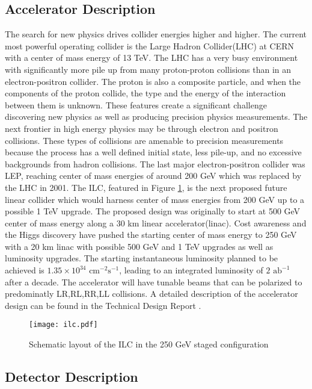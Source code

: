 \subsection{Accelerator Description}
\label{ilc}


The search for new physics drives collider energies higher and higher. The current most powerful operating collider is the Large Hadron Collider(LHC) at CERN with a center of mass energy of 13 TeV. The LHC has a very busy environment with significantly more pile up from many proton-proton collisions than in an electron-positron collider. The proton is also a composite particle, and when the components of the proton collide, the type and the energy of the interaction between them is unknown. These features create a significant challenge discovering new physics as well as producing precision physics measurements. The next frontier in high energy physics may be through electron and positron collisions. These types of collisions are amenable to precision measurements because the process has a well defined initial state, less pile-up, and no excessive backgrounds from hadron collisions. The last major electron-positron collider was LEP, reaching center of mass energies of around 200 GeV which was replaced by the LHC in 2001.  The ILC, featured in Figure \ref{fig:ilc}, is the next proposed future linear collider which would harness center of mass energies from 200 GeV up to a possible 1 TeV upgrade.  The proposed design was originally to start at 500 GeV center of mass energy along a 30 km linear accelerator(linac). Cost awareness and the Higgs discovery have pushed the starting center of mass energy to 250 GeV  with a 20 km linac with possible 500 GeV and 1 TeV upgrades as well as luminosity upgrades.  The starting instantaneous luminosity planned to be achieved is $1.35 \times 10^{34} \, \, \text{cm}^{-2}\text{s}^{-1}$, leading to an integrated luminosity of $2 \, \, \text{ab}^{-1}$ after a decade. The accelerator will have tunable beams that can be polarized to predominatly LR,RL,RR,LL collisions.\cite{currdetector} A detailed description of the accelerator design can be found in the Technical Design Report \cite{tdraccel}.

\begin{figure}
\centering
\texttt{[image: ilc.pdf]}
\caption{Schematic layout of the ILC in the 250 GeV staged configuration \cite{currdetector} }
\label{fig:ilc}
\end{figure}

\subsection{Detector Description}
\label{ild}

